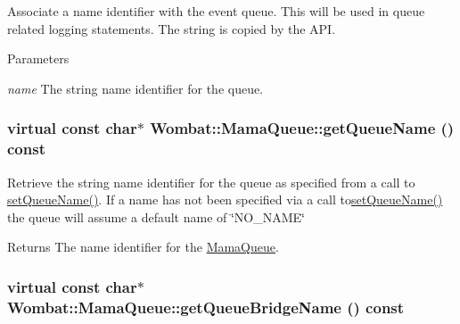Associate a name identifier with the event queue. This will be used in queue related logging statements. The string is copied by the API.


\begin{DoxyParams}{Parameters}
\item[{\em name}]The string name identifier for the queue. \end{DoxyParams}
\hypertarget{classWombat_1_1MamaQueue_a123d62bb20895701ac0407831f3cad1f}{
\subsubsection[{getQueueName}]{\setlength{\rightskip}{0pt plus 5cm}virtual const char$\ast$ Wombat::MamaQueue::getQueueName () const}}
\label{classWombat_1_1MamaQueue_a123d62bb20895701ac0407831f3cad1f}


Retrieve the string name identifier for the queue as specified from a call to {\ttfamily \hyperlink{classWombat_1_1MamaQueue_ab44bf7f7f43693737d58f0155dbf7cc3}{setQueueName()}}. If a name has not been specified via a call to{\ttfamily \hyperlink{classWombat_1_1MamaQueue_ab44bf7f7f43693737d58f0155dbf7cc3}{setQueueName()}} the queue will assume a default name of \char`\"{}NO\_\-NAME\char`\"{}

\begin{DoxyReturn}{Returns}
The name identifier for the \hyperlink{classWombat_1_1MamaQueue}{MamaQueue}. 
\end{DoxyReturn}
\hypertarget{classWombat_1_1MamaQueue_ae3cbaac8f65debeb5989f0d084091033}{
\subsubsection[{getQueueBridgeName}]{\setlength{\rightskip}{0pt plus 5cm}virtual const char$\ast$ Wombat::MamaQueue::getQueueBridgeName () const}}
\label{classWombat_1_1MamaQueue_ae3cbaac8f65debeb5989f0d084091033}



